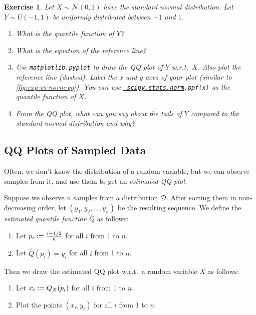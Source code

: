 \documentclass[12pt]{article}
\newcommand*{\Dcal}{\mathcal{D}}
\newcommand*{\Ncal}{\mathcal{N}}
\newcommand*{\Qhat}{\widehat{Q}}
\newtheorem{exercise}{Exercise}[section]
\begin{document}
\begin{tcolorbox}[progExe]
\begin{exercise}
\label{exe:unif-vs-norm-qq}
Let $X \sim \Ncal(0, 1)$ have the standard normal distribution.
Let $Y \sim U(-1, 1)$ be uniformly distributed between $-1$ and $1$.
\begin{enumerate}[label=(\alph*)]
\item What is the quantile function of $Y$?
\item What is the equation of the reference line?
\item Use \texttt{matplotlib.pyplot} to draw the QQ plot of $Y$ w.r.t.~$X$.
    Also plot the reference line (dashed).
    Label the $x$ and $y$ axes of your plot (similar to \cref{fig:exp-vs-norm-qq}).
    \textcolor{progExeSec}{You can use \texttt{\href{https://docs.scipy.org/doc/scipy/reference/generated/scipy.stats.norm.html}{%
\textcolor{progExeSec}{scipy.stats.norm}}.ppf(x)} as the quantile function of $X$.}
\item From the QQ plot, what can you say about the tails of $Y$
    compared to the standard normal distribution and why?
\end{enumerate}
\end{exercise}
\end{tcolorbox}

\subsection{QQ Plots of Sampled Data}

Often, we don't know the distribution of a random variable, but we can observe samples from it,
and use them to get an \emph{estimated QQ plot}.

Suppose we observe $n$ samples from a distribution $\Dcal$.
After sorting them in non-decreasing order, let
$(y_1, y_2, \ldots, y_n)$ be the resulting sequence.
We define the \emph{estimated quantile function} $\Qhat$ as follows:
\begin{enumerate}
\item Let $p_i := \frac{i-1/2}{n}$ for all $i$ from 1 to $n$.
\item Let $\Qhat(p_i) = y_i$ for all $i$ from 1 to $n$.
\end{enumerate}

Then we draw the estimated QQ plot w.r.t.~a random variable $X$ as follows:
\begin{enumerate}
\item Let $x_i := Q_X(p_i)$ for all $i$ from 1 to $n$.
\item Plot the points $(x_i, y_i)$ for all $i$ from 1 to $n$.
\end{enumerate}
\end{document}
